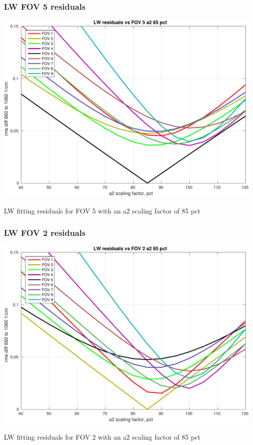 \documentclass[11pt]{beamer}
\begin{document}
\begin{frame}
\frametitle{LW FOV 5 residuals}
\begin{center}
  \includegraphics[scale=0.5]{figures/LW_resids_FOV_5_a2_85.pdf}
\end{center}
\begin{center}
  LW fitting residuals for FOV 5 with an a2 scaling factor of 85 pct
\end{center}
\end{frame}
\begin{frame}
\frametitle{LW FOV 2 residuals}
\begin{center}
  \includegraphics[scale=0.5]{figures/LW_resids_FOV_2_a2_85.pdf}
\end{center}
\begin{center}
  LW fitting residuals for FOV 2 with an a2 scaling factor of 85 pct
\end{center}
\end{frame}
\end{document}
